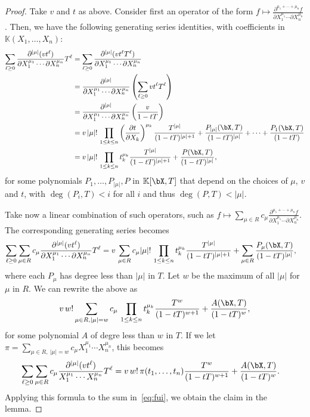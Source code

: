 \documentclass[12pt]{article}
\def\K {\ensuremath{\mathbb{K}}}
\begin{document}
\begin{proof}
  Take $v$ and $t$ as above. Consider first
  an operator of the form $f \mapsto \frac{ \partial^{\mu_1+\cdots+\mu_n}  f}
  {\partial X_1^{\mu_1} \cdots \partial X_n^{\mu_n}}$. Then, we have
  the following generating series identities, with coefficients in 
  $\K(X_1,\dots,X_n)$:
\begin{align*}
\sum_{\ell \ge 0} 
\frac{ \partial^{|\mu|} ( v t^\ell )} {\partial X_1^{\mu_1} \cdots
  \partial X_n^{\mu_n}}
 T^\ell 
&=  \sum_{\ell \ge 0} 
\frac{ \partial^{|\mu|} (v t^\ell T^\ell)} {\partial X_1^{\mu_1} \cdots
  \partial X_n^{\mu_n}}\\
&=  
\frac{ \partial^{|\mu|} } {\partial X_1^{\mu_1} \cdots
  \partial X_n^{\mu_n}}
 \left (\sum_{\ell \ge 0} v t^\ell T^\ell\right ) \\
&= \frac{ \partial^{|\mu|} } {\partial X_1^{\mu_1} \cdots
  \partial X_n^{\mu_n}}
 \left (\frac v{1-tT} \right ) \\
&= v\, |\mu|!\, \prod_{1 \le k \le n} 
\left (\frac{ \partial t} {\partial X_k} \right)^{\mu_k}
\frac {T^{|\mu|}}{(1-t T)^{|\mu|+1}} + \frac{P_{|\mu|}(\bX,T)}{(1-t T)^{|\mu|}} + \cdots + \frac{P_{1}(\bX,T)}{(1-t T)}\\
&= v\, |\mu|!\, \prod_{1 \le k \le n} 
t_k^{\mu_k}
\frac {T^{|\mu|}}{(1-t T)^{|\mu|+1}} + \frac{P(\bX,T)}{(1-t T)^{|\mu|}},
\end{align*}
for some polynomials $P_1,\dots,P_{|\mu|},P$ in $\K[\bX,T]$ that
depend on the choices of $\mu$, $v$ and $t$, with $\deg(P_i,T) < i$
for all $i$ and thus $\deg(P,T) < |\mu|$.

Take now a linear combination of such operators, such as 
$f \mapsto \sum_{\mu \in R} c_\mu \frac{ \partial^{\mu_1 +\cdots + \mu_n}  f } {\partial X_1^{\mu_1} \cdots
  \partial X_n^{\mu_n}}$. The corresponding generating series
becomes
\begin{align*}
\sum_{\ell \ge 0} 
\sum_{\mu \in R} c_\mu \frac{ \partial^{|\mu|} ( v t^\ell )} {\partial X_1^{\mu_1} \cdots
  \partial X_n^{\mu_n}}
 T^\ell 
&=
v\,\sum_{\mu \in R} c_\mu
 |\mu|!\, \prod_{1 \le k \le n} 
t_k^{\mu_k}
\frac {T^{|\mu|}}{(1-t T)^{|\mu|+1}} +\sum_{\mu \in R} \frac{P_\mu(\bX,T)}{(1-t T)^{|\mu|}},
\end{align*}
where each $P_\mu$ has degree less than $|\mu|$ in $T$.
Let $w$ be the maximum of all $|\mu|$ for $\mu$ in $R$. We can rewrite 
the above as
\begin{align*}
v\, w! 
\sum_{\mu \in R, |\mu|=w} c_\mu
\, \prod_{1 \le k \le n} 
t_k^{\mu_k}
\frac {T^{w}}{(1-t T)^{w+1}}
 + \frac{A(\bX,T)}{(1-t T)^{w}},
\end{align*}
for some polynomial $A$ of degre less than $w$ in $T$. If we let 
$\pi =\sum_{\mu \in R,\ |\mu|=w} c_{\mu} X_1^{\mu_1} \cdots
  X_n^{\mu_n}$, this becomes
\begin{align*}
\sum_{\ell \ge 0} 
\sum_{\mu \in R} c_\mu \frac{ \partial^{|\mu|} ( v t^\ell )} { X_1^{\mu_1} \cdots
 X_n^{\mu_n}}
 T^\ell 
&=
v\, w! \,  \pi(t_1,\dots,t_n)
\frac {T^{w}}{(1-t T)^{w+1}}
 + \frac{A(\bX,T)}{(1-t T)^{w}}.
\end{align*}
Applying this formula to the sum in~\eqref{eq:fui}, we obtain the
claim in the lemma.
\end{proof}
\end{document}
